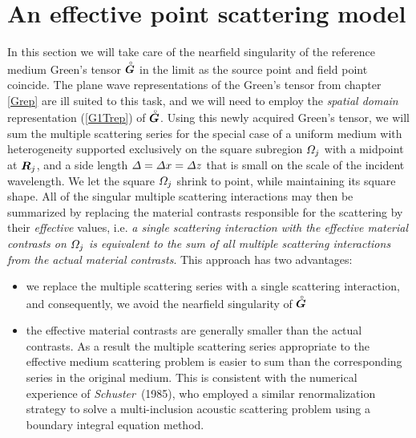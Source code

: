 \section{An effective point scattering model} \label{secEffScat}
In this section we will take care of the nearfield singularity of the 
reference medium Green's tensor ${\stackrel{\scriptscriptstyle _{\,\,\circ}}{ \mbox{\boldmath$\mit G$\unboldmath}}}$ in the limit as the 
source point and field point coincide. The plane wave representations of 
the Green's tensor from chapter \ref{Grep} are ill suited to this task, 
and we will need to employ 
the {\em spatial domain\/} representation (\ref{G1Trep}) of ${\stackrel{\scriptscriptstyle _{\,\,\circ}}{ \mbox{\boldmath$\mit G$\unboldmath}}}$. Using this 
newly acquired Green's tensor, we will sum the multiple scattering series 
for the special case of a uniform medium with heterogeneity supported 
exclusively on the square subregion
${\mit \Omega}_j$ with a midpoint at ${\mbox{\boldmath$\mit R$\unboldmath}}_j$, and 
a side length ${\mit \Delta}={\mit \Delta}x={\mit \Delta}z$ 
that is small on the scale of the incident 
wavelength. We let the square ${\mit \Omega}_j$ shrink to point, while 
maintaining its square shape. All of the singular multiple scattering 
interactions may then be summarized by replacing the material contrasts 
responsible for the scattering by their {\em effective \/} values, i.e. 
{\em a single scattering interaction with  the effective material contrasts 
on ${\mit \Omega}_j$ is equivalent to the sum of all multiple scattering 
interactions from the actual material contrasts\/}. This approach has two 
advantages:
\begin{itemize}
\item we replace the multiple scattering series with a 
single scattering interaction, and consequently, we avoid the nearfield 
singularity of  ${\stackrel{\scriptscriptstyle _{\,\,\circ}}{ \mbox{\boldmath$\mit G$\unboldmath}}}$

\item the effective material contrasts are generally smaller than the 
actual contrasts. As a result the multiple scattering series appropriate 
to the  effective medium scattering problem is 
easier  to sum than the corresponding series in the original medium. This 
is consistent with the numerical experience of {\em Schuster\/}~(1985), 
who employed a similar renormalization strategy to solve a multi-inclusion 
acoustic scattering problem using a boundary integral equation method.
\end{itemize}

